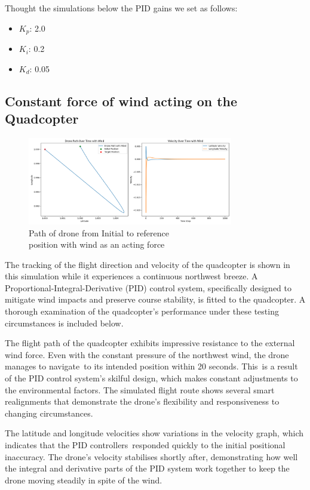 \documentclass{article}
\begin{document}
Thought the simulations below the PID gains we set as follows: 

\begin{itemize}
  \item \(K_p\): 2.0
  \item \(K_i\): 0.2
  \item \(K_d\): 0.05
\end{itemize}

\subsection*{Constant force of wind acting on the Quadcopter}
\begin{figure}[H]
  \centering
  \includegraphics[width=0.8\textwidth]{Pictures/Drone_path_wind.png} 
  \caption{Path of drone from Initial to reference \\ position with wind as an acting force}
  \label{fig:Drone_path_wind}
\end{figure}
The tracking of the flight direction and velocity of the quadcopter is shown in this simulation while it experiences a continuous northwest breeze. A Proportional-Integral-Derivative (PID) control system, specifically designed to mitigate wind impacts and preserve course stability, is fitted to the quadcopter. A thorough examination of the quadcopter's 
performance under these testing circumstances is included below.

The flight path of the quadcopter exhibits impressive resistance to the external wind force. Even with the constant pressure of the northwest wind, the drone manages to navigate to its intended position within 20 seconds. This is a result of the PID control system's skilful design, which makes constant adjustments to the environmental factors. 
The simulated flight route shows several smart realignments that demonstrate the drone's flexibility and responsiveness to changing circumstances.

The latitude and longitude velocities show variations in the velocity graph, which indicates that the PID controllers responded quickly to the initial positional inaccuracy. The drone's velocity stabilises shortly after, demonstrating how well the integral and derivative parts of the PID system work together to keep the drone moving steadily in spite of the wind.
\end{document}
